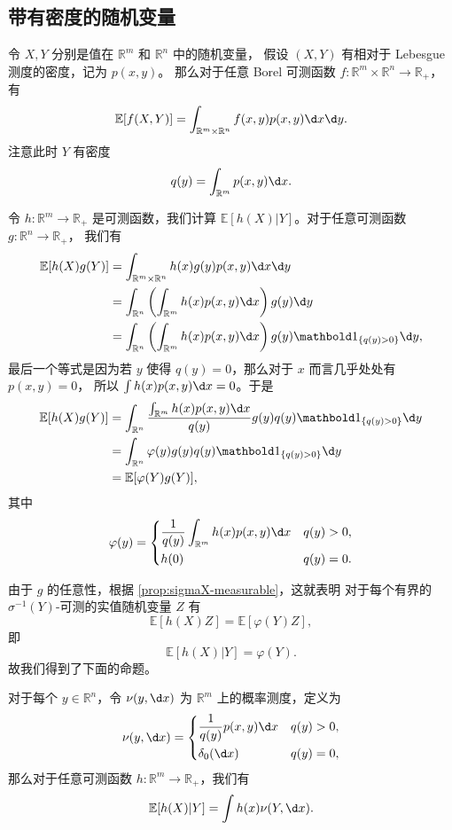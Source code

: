 \documentclass[fontset=none]{Notes}
\newcommand{\indicator}[1]{\mathbold 1_{#1}}
\begin{document}
\subsection{带有密度的随机变量}

令 $X,Y$ 分别是值在 $\mathbb{R}^m$ 和 $\mathbb{R}^n$ 中的随机变量，
假设 $(X,Y)$ 有相对于 Lebesgue 测度的密度，记为 $p(x,y)$。
那么对于任意 Borel 可测函数 $f:\mathbb{R}^m\times \mathbb{R}^n\to \mathbb{R}_+$，有
\[
  \mathbb{E}[f(X,Y)]=\int_{\mathbb{R}^m\times \mathbb{R}^n}
  f(x,y)p(x,y)\d x\d y.  
\]
注意此时 $Y$ 有密度
\[
  q(y)=\int_{\mathbb{R}^m}p(x,y)\d x.
\]

令 $h:\mathbb{R}^m\to \mathbb{R}_+$ 是可测函数，我们计算
$\mathbb{E}[h(X)|Y]$。对于任意可测函数 $g:\mathbb{R}^n\to \mathbb{R}_+$，
我们有
\begin{align*}
  \mathbb{E}[h(X)g(Y)]&=\int_{\mathbb{R}^m\times \mathbb{R}^n}
  h(x)g(y)p(x,y)\d x\d y\\
  &=\int_{\mathbb{R}^n}\left(\int_{\mathbb{R}^m}h(x)p(x,y)\d x\right)g(y)\d y\\
  &=\int_{\mathbb{R}^n}\left(\int_{\mathbb{R}^m}h(x)p(x,y)\d x\right)
  g(y)\indicator{\{q(y)>0\}}\d y,
\end{align*}
最后一个等式是因为若 $y$ 使得 $q(y)=0$，那么对于 $x$ 而言几乎处处有 $p(x,y)=0$，
所以 $\int h(x)p(x,y)\d x=0$。于是 
\begin{align*}
  \mathbb{E}[h(X)g(Y)]&=\int_{\mathbb{R}^n}
  \frac{\int_{\mathbb{R}^m}h(x)p(x,y)\d x}{q(y)}
  g(y)q(y)\indicator{\{q(y)>0\}}\d y\\
  &=\int_{\mathbb{R}^n}\varphi(y)g(y)q(y)\indicator{\{q(y)>0\}}\d y\\
  &=\mathbb{E}[\varphi(Y)g(Y)],
\end{align*}
其中
\[
  \varphi(y)=\begin{dcases}
    \frac{1}{q(y)}\int_{\mathbb{R}^m}h(x)p(x,y)\d x & q(y)>0,\\
    h(0) & q(y)=0.
  \end{dcases}  
\]

由于 $g$ 的任意性，根据 \autoref{prop:sigmaX-measurable}，这就表明
对于每个有界的 $\sigma^{-1}(Y)$-可测的实值随机变量 $Z$ 有
\[
  \mathbb{E}[h(X)Z]=\mathbb{E}[\varphi(Y)Z],  
\]
即
\[
  \mathbb{E}[h(X)|Y]=\varphi(Y).  
\]
故我们得到了下面的命题。

\begin{proposition}
  对于每个 $y\in \mathbb{R}^n$，令 $\nu(y,\d x)$ 为
  $\mathbb{R}^m$ 上的概率测度，定义为
  \[
    \nu(y,\d x)=\begin{dcases}
      \frac{1}{q(y)}p(x,y)\d x & q(y)>0,\\
      \delta_0(\d x) & q(y)=0,
    \end{dcases}  
  \]
  那么对于任意可测函数 $h:\mathbb{R}^m\to \mathbb{R}_+$，我们有
  \[
    \mathbb{E}[h(X)|Y]=\int h(x)\nu(Y,\d x).  
  \]
\end{proposition}
\end{document}
